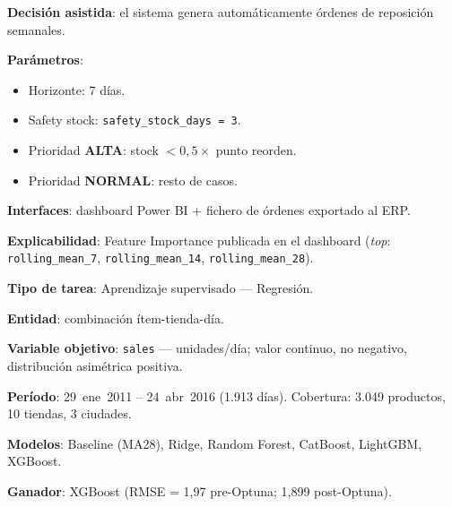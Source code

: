 \documentclass[12pt, a4paper, oneside]{report}
\newcommand{\code}[1]{\texttt{\small\color{codeblue}#1}}
\begin{document}
\noindent
\begin{minipage}[t]{0.485\textwidth}
\begin{tcolorbox}[canvasbox, title={2.\ Decisions}]
\textbf{Decisi\'on asistida}: el sistema genera autom\'aticamente \'ordenes de reposici\'on semanales.

\medskip
\textbf{Par\'ametros}:
\begin{itemize}[noitemsep, leftmargin=*]
  \item Horizonte: 7 d\'ias.
  \item Safety stock: \code{safety\_stock\_days = 3}.
  \item Prioridad \textbf{ALTA}: stock $< 0{,}5 \times$ punto reorden.
  \item Prioridad \textbf{NORMAL}: resto de casos.
\end{itemize}

\medskip
\textbf{Interfaces}: dashboard Power BI + fichero de \'ordenes exportado al ERP.

\medskip
\textbf{Explicabilidad}: Feature Importance publicada en el dashboard (\textit{top}: \code{rolling\_mean\_7}, \code{rolling\_mean\_14}, \code{rolling\_mean\_28}).
\end{tcolorbox}
\end{minipage}
\hfill
\begin{minipage}[t]{0.485\textwidth}
\begin{tcolorbox}[canvasbox, title={3.\ Prediction Task}]
\textbf{Tipo de tarea}: Aprendizaje supervisado --- Regresi\'on.

\medskip
\textbf{Entidad}: combinaci\'on \'item-tienda-d\'ia.

\medskip
\textbf{Variable objetivo}: \code{sales} --- unidades/d\'ia; valor continuo, no negativo, distribuci\'on asim\'etrica positiva.

\medskip
\textbf{Per\'iodo}: 29~ene~2011 -- 24~abr~2016 (1.913 d\'ias). Cobertura: 3.049 productos, 10 tiendas, 3 ciudades.

\medskip
\textbf{Modelos}: Baseline (MA28), Ridge, Random Forest, CatBoost, LightGBM, XGBoost.

\medskip
\textbf{Ganador}: XGBoost (RMSE = 1,97 pre-Optuna; 1,899 post-Optuna).
\end{tcolorbox}
\end{minipage}

\vspace{0.4cm}
\end{document}
